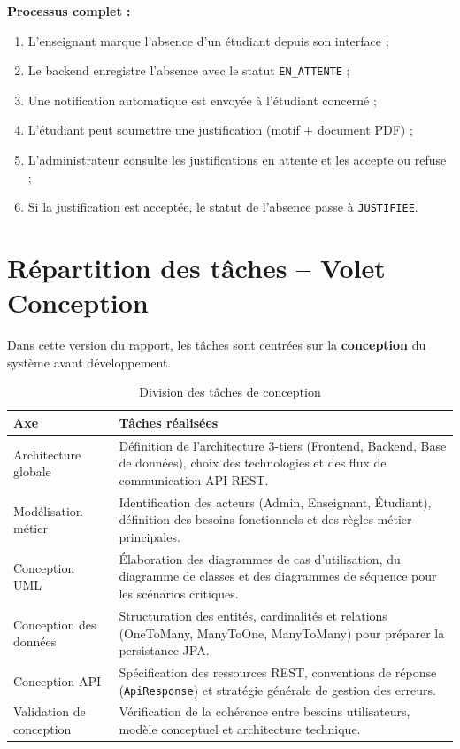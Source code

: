 \textbf{Processus complet :}
\begin{enumerate}[noitemsep]
    \item L'enseignant marque l'absence d'un étudiant depuis son interface ;
    \item Le backend enregistre l'absence avec le statut \texttt{EN\_ATTENTE} ;
    \item Une notification automatique est envoyée à l'étudiant concerné ;
    \item L'étudiant peut soumettre une justification (motif + document PDF) ;
    \item L'administrateur consulte les justifications en attente et les accepte ou refuse ;
    \item Si la justification est acceptée, le statut de l'absence passe à \texttt{JUSTIFIEE}.
\end{enumerate}

\section{Répartition des tâches -- Volet Conception}

Dans cette version du rapport, les tâches sont centrées sur la \textbf{conception} du système avant développement.

\begin{table}[H]
\centering
\caption{Division des tâches de conception}
\label{tab:taches_conception}
\begin{tabularx}{\textwidth}{lX}
\toprule
\textbf{Axe} & \textbf{Tâches réalisées} \\
\midrule
Architecture globale & Définition de l'architecture 3-tiers (Frontend, Backend, Base de données), choix des technologies et des flux de communication API REST. \\
Modélisation métier & Identification des acteurs (Admin, Enseignant, Étudiant), définition des besoins fonctionnels et des règles métier principales. \\
Conception UML & Élaboration des diagrammes de cas d'utilisation, du diagramme de classes et des diagrammes de séquence pour les scénarios critiques. \\
Conception des données & Structuration des entités, cardinalités et relations (OneToMany, ManyToOne, ManyToMany) pour préparer la persistance JPA. \\
Conception API & Spécification des ressources REST, conventions de réponse (\texttt{ApiResponse}) et stratégie générale de gestion des erreurs. \\
Validation de conception & Vérification de la cohérence entre besoins utilisateurs, modèle conceptuel et architecture technique. \\
\bottomrule
\end{tabularx}
\end{table}

\newpage

